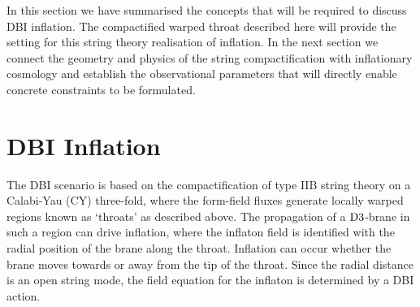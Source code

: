 In this section we have summarised the concepts that will be
required to discuss DBI inflation. The compactified warped throat described
here will provide the setting for this string theory realisation of
inflation. 
In the next
section we connect the geometry and physics of the string compactification with
inflationary cosmology and establish the observational parameters that will directly
enable concrete constraints to be formulated. 

% 
% 
\section{DBI Inflation} 
% 
\label{sec:dbiinflation}
The DBI scenario is based on the compactification of type IIB string theory on a 
Calabi-Yau (CY) three-fold, where the form-field fluxes generate locally
warped regions known as `throats' as described above.  The propagation of a 
${\rm D3}$-brane in such a region can drive inflation, where the inflaton 
field is identified with the radial position of the brane 
along the throat. Inflation can occur whether the brane moves towards or away from the tip of the
throat.
Since the radial distance is an open string mode, the field 
equation for the inflaton is determined by a DBI action.

